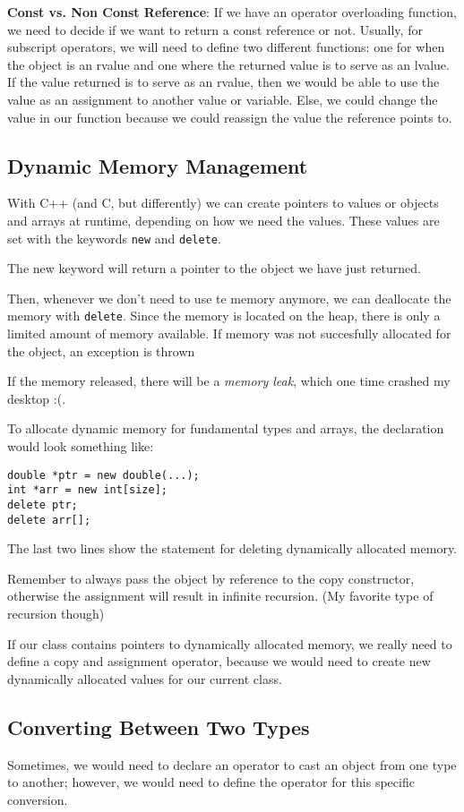\documentclass{article}
\begin{document}
\textbf{Const vs. Non Const Reference}: If we have an operator overloading function, we need to decide if 
we want to return a const reference or not. Usually, for subscript operators, we will need to define 
two different functions: one for when the object is an rvalue and one where the returned value is to 
serve as an lvalue. If the value returned is to serve as an rvalue, then we would be able to use the value 
as an assignment to another value or variable. Else, we could change the value in our function because
we could reassign the value the reference points to.
\subsection{Dynamic Memory Management}
With C++ (and C, but differently) we can create pointers to values or objects and arrays at runtime, depending 
on how we need the values. These values are set with the keywords \texttt{new} and \texttt{delete}. 

The new keyword will return a pointer to the object we have just returned.

Then, whenever we don't need to use te memory anymore, we can deallocate the memory with \texttt{delete}. 
Since the memory is located on the heap, there is only a limited amount of memory available. If memory
was not succesfully allocated for the object, an exception is thrown

If the memory released, there will be a \textit{memory leak}, which one time crashed my desktop :(.

To allocate dynamic memory for fundamental types and arrays, the declaration would look something like: 
\begin{verbatim}
double *ptr = new double(...);
int *arr = new int[size];
delete ptr;
delete arr[];
\end{verbatim}
The last two lines show the statement for deleting dynamically allocated memory.

Remember to always pass the object by reference to the copy constructor, otherwise the assignment will result
in infinite recursion. (My favorite type of recursion though)

If our class contains pointers to dynamically allocated memory, we really need to define a copy and 
assignment operator, because we would need to create new dynamically allocated values for our current class. 
\subsection{Converting Between Two Types}
Sometimes, we would need to declare an operator to cast an object from one type to another; however, we
would need to define the operator for this specific conversion. 
\end{document}
